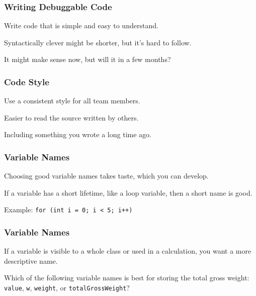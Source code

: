 \begin{frame}
\frametitle{Writing Debuggable Code}
\begin{changemargin}{1cm}

Write code that is simple and easy to understand.

Syntactically clever might be shorter, but it's hard to follow.

It might make sense now, but will it in a few months?

\end{changemargin}
\end{frame}

\begin{frame}
\frametitle{Code Style}
\begin{changemargin}{1cm}

Use a consistent style for all team members.

Easier to read the source written by others.

Including something you wrote a long time ago.

\end{changemargin}
\end{frame}

\begin{frame}
\frametitle{Variable Names}
\begin{changemargin}{1cm}

Choosing good variable names takes taste, which you can develop.

If a variable has a short lifetime, like a loop variable, then a short name
is good.

Example: {\tt for (int i = 0; i < 5; i++)}

\end{changemargin}
\end{frame}

\begin{frame}
\frametitle{Variable Names}
\begin{changemargin}{1cm}

If a variable is visible to a whole class or used in a calculation, you want a more descriptive name.

Which of the following variable names is best for storing the total gross weight: \texttt{value}, \texttt{w}, \texttt{weight}, or \texttt{totalGrossWeight}? 

\end{changemargin}
\end{frame}

